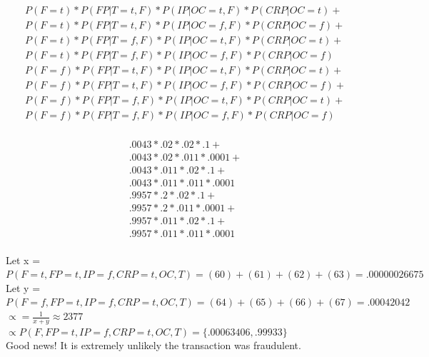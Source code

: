 \documentclass[12pt]{article}
\begin{document}
\begin{gather}
 P(F= t)*P(FP|T = t, F)* P(IP|OC=t,F)*P(CRP|OC=t) + \\
 P(F= t)*P(FP|T = t, F)* P(IP|OC=f,F)*P(CRP|OC=f) + \\
 P(F= t)*P(FP|T = f, F)* P(IP|OC=t,F)*P(CRP|OC=t) + \\
 P(F= t)*P(FP|T = f, F)* P(IP|OC=f,F)*P(CRP|OC=f)  \\
 P(F= f)*P(FP|T = t, F)* P(IP|OC=t,F)*P(CRP|OC=t) + \\
 P(F= f)*P(FP|T = t, F)* P(IP|OC=f,F)*P(CRP|OC=f) + \\
 P(F= f)*P(FP|T = f, F)* P(IP|OC=t,F)*P(CRP|OC=t) + \\
 P(F= f)*P(FP|T = f, F)* P(IP|OC=f,F)*P(CRP|OC=f) 
\end{gather}\\
\begin{gather}
.0043*.02*.02*.1 + \\
.0043*.02*.011*.0001 + \\
.0043*.011*.02*.1 + \\
.0043*.011*.011*.0001 \\
.9957*.2*.02*.1 + \\
.9957*.2*.011*.0001 + \\
.9957*.011*.02*.1 + \\
.9957*.011*.011*.0001 
\end{gather}\\
Let x = $P(F = t, FP = t, IP = f, CRP = t, OC, T) = (60) + (61) + (62) + (63) =  .00000026675$\\
Let y = $P(F = f, FP = t, IP = f, CRP = t, OC, T) = (64) + (65) + (66) + (67) = .00042042$\\
$\propto = \frac{1}{x+y} \approx 2377$\\
$\propto P(F, FP = t, IP = f, CRP = t, OC, T) = \{.00063406,.99933\}$ \\ 
Good news! It is extremely unlikely the transaction was fraudulent.\\
\end{document}
